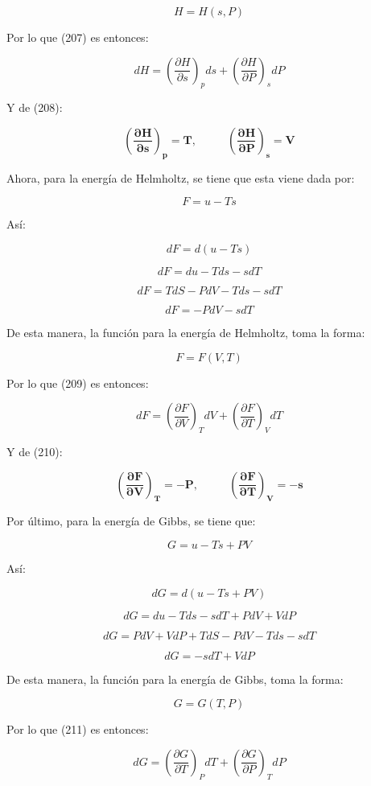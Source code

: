 \documentclass[]{article}
\begin{document}
\[H = H(s,P)\]

Por lo que (207) es entonces:

\[dH = \left( \frac{\partial H}{\partial s} \right)_{p}ds + \left( \frac{\partial H}{\partial P} \right)_{s}dP\]

Y de (208):

\[\left( \frac{\mathbf{\partial H}}{\mathbf{\partial s}} \right)_{\mathbf{p}}\mathbf{= T,\ \ \ \ \ \ \ \ \ \ \ \ }\left( \frac{\mathbf{\partial H}}{\mathbf{\partial P}} \right)_{\mathbf{s}}\mathbf{= V}\]

Ahora, para la energía de Helmholtz, se tiene que esta viene dada por:

\[F = u - Ts\]

Así:

\[dF = d(u - Ts)\]

\[dF = du - Tds - sdT\]

\[dF = TdS - PdV - Tds - sdT\]

\[dF = - PdV - sdT\]

De esta manera, la función para la energía de Helmholtz, toma la forma:

\[F = F(V,T)\]

Por lo que (209) es entonces:

\[dF = \left( \frac{\partial F}{\partial V} \right)_{T}dV + \left( \frac{\partial F}{\partial T} \right)_{V}dT\]

Y de (210):

\[\left( \frac{\mathbf{\partial F}}{\mathbf{\partial V}} \right)_{\mathbf{T}}\mathbf{= - P,\ \ \ \ \ \ \ \ \ \ \ \ }\left( \frac{\mathbf{\partial F}}{\mathbf{\partial T}} \right)_{\mathbf{V}}\mathbf{= - s}\]

Por último, para la energía de Gibbs, se tiene que:

\[G = u - Ts + PV\]

Así:

\[dG = d(u - Ts + PV)\]

\[dG = du - Tds - sdT + PdV + VdP\]

\[dG = PdV + VdP + TdS - PdV - Tds - sdT\]

\[dG = - sdT + VdP\]

De esta manera, la función para la energía de Gibbs, toma la forma:

\[G = G(T,P)\]

Por lo que (211) es entonces:

\[dG = \left( \frac{\partial G}{\partial T} \right)_{P}dT + \left( \frac{\partial G}{\partial P} \right)_{T}dP\]
\end{document}
